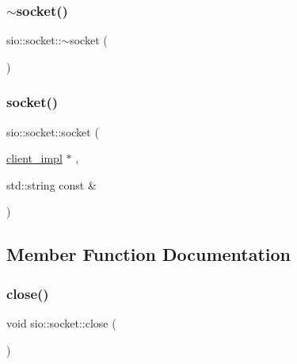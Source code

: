 \subsubsection{\texorpdfstring{$\sim$socket()}{~socket()}}
{\footnotesize\ttfamily sio\+::socket\+::$\sim$socket (\begin{DoxyParamCaption}{ }\end{DoxyParamCaption})}

\mbox{\label{classsio_1_1socket_ab4abbc8aa5356f4f48f0b1fa66c08e4b}} 
\subsubsection{\texorpdfstring{socket()}{socket()}}
{\footnotesize\ttfamily sio\+::socket\+::socket (\begin{DoxyParamCaption}\item[{\hyperlink{classsio_1_1socket_a9598885c403f201c146fd19d243051df}{client\+\_\+impl} $\ast$}]{,  }\item[{std\+::string const \&}]{ }\end{DoxyParamCaption})\hspace{0.3cm}{\ttfamily [protected]}}



\subsection{Member Function Documentation}
\mbox{\label{classsio_1_1socket_ae5073be58def64d16ead9806c24df8ec}} 
\subsubsection{\texorpdfstring{close()}{close()}}
{\footnotesize\ttfamily void sio\+::socket\+::close (\begin{DoxyParamCaption}{ }\end{DoxyParamCaption})}

\mbox{\label{classsio_1_1socket_a76a3f52dec0e3fc16721183faa0e3def}} 
